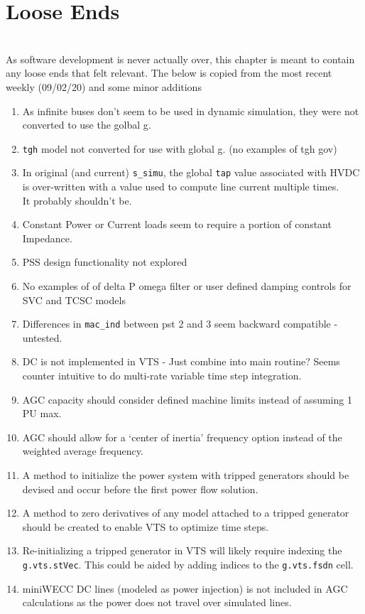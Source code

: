 \chapter{Loose Ends} \ \\
As software development is never actually over, this chapter is meant to contain any loose ends that felt relevant.
The below is copied from the most recent weekly (09/02/20) and some minor additions

\begin{enumerate}
	\item As infinite buses don't seem to be used in dynamic simulation, they were not converted to use the golbal g.
	\item \verb|tgh| model not converted for use with global g. (no examples of tgh gov)
	\item In original (and current) \verb|s_simu|, the global \verb|tap| value associated with HVDC is over-written with  a value used to compute line current multiple times. \\It probably shouldn't be.
	\item Constant Power or Current loads seem to require a portion of constant Impedance.
	\item PSS design functionality not explored
	\item No examples of of delta P omega filter or user defined damping controls for SVC and TCSC models
	\item Differences in \verb|mac_ind| between pst 2 and 3 seem backward compatible - untested.
	\item DC is not implemented in VTS - Just combine into main routine? Seems counter intuitive to do multi-rate variable time step integration.
	\item AGC capacity should consider defined machine limits instead of assuming 1 PU max.
	\item AGC should allow for a `center of inertia' frequency option instead of the weighted average frequency.
	\item A method to initialize the power system with tripped generators should be devised and occur before the first power flow solution.
	\item A method to zero derivatives of any model attached to a tripped generator should be created to enable VTS to optimize time steps.
	\item Re-initializing a tripped generator in VTS will likely require indexing the \verb|g.vts.stVec|. This could be aided by adding indices to the \verb|g.vts.fsdn| cell.
	\item miniWECC DC lines (modeled as power injection) is not included in AGC calculations as the power does not travel over simulated lines.
\end{enumerate}

